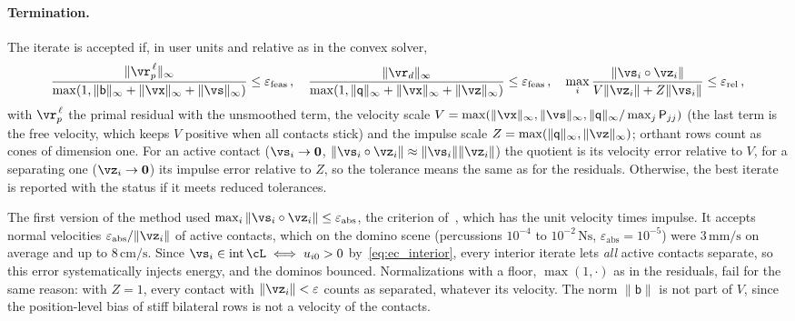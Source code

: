 \paragraph{Termination.} The iterate is accepted if, in user units and relative as in the convex solver,
%
\begin{equation}\label{eq:ec_termination}
	\frac{\|\vr_p^{\,\ell}\|_\infty}{\max(1, \|\mathsf{b}\|_\infty + \|\vx\|_\infty + \|\vs\|_\infty)} \leq \varepsilon_{\mathrm{feas}} \, , \quad
	\frac{\|\vr_d\|_\infty}{\max(1, \|\mathsf{q}\|_\infty + \|\vx\|_\infty + \|\vz\|_\infty)} \leq \varepsilon_{\mathrm{feas}} \, , \quad
	\max_i \frac{\|\vs_i\circ\vz_i\|}{V\|\vz_i\| + Z\|\vs_i\|} \leq \varepsilon_{\mathrm{rel}} \, ,
\end{equation}
%
with $\vr_p^{\,\ell}$ the primal residual with the unsmoothed term, the velocity scale $V = \max(\|\vx\|_\infty, \|\vs\|_\infty, \|\mathsf{q}\|_\infty/\max_j \mathsf{P}_{jj})$ (the last term is the free velocity, which keeps $V$ positive when all contacts stick) and the impulse scale $Z = \max(\|\mathsf{q}\|_\infty, \|\vz\|_\infty)$; orthant rows count as cones of dimension one. For an active contact ($\vs_i \to \mathbf{0}$, $\|\vs_i\circ\vz_i\| \approx \|\vs_i\|\|\vz_i\|$) the quotient is its velocity error relative to $V$, for a separating one ($\vz_i \to \mathbf{0}$) its impulse error relative to $Z$, so the tolerance means the same as for the residuals. Otherwise, the best iterate is reported with the status  if it meets reduced tolerances.

The first version of the method used $\max_i\|\vs_i\circ\vz_i\| \leq \varepsilon_\mathrm{abs}$, the criterion of~\cite{Acary2026}, which has the unit velocity times impulse. It accepts normal velocities $\varepsilon_\mathrm{abs}/\|\vz_i\|$ of active contacts, which on the domino scene (percussions $10^{-4}$ to $10^{-2}\,\mathrm{Ns}$, $\varepsilon_\mathrm{abs} = 10^{-5}$) were $3\,\mathrm{mm/s}$ on average and up to $8\,\mathrm{cm/s}$. Since $\vs_i \in \operatorname{int}\cL \iff u_{i0} > 0$ by~\eqref{eq:ec_interior}, every interior iterate lets \emph{all} active contacts separate, so this error systematically injects energy, and the dominos bounced. Normalizations with a floor, $\max(1, \cdot)$ as in the residuals, fail for the same reason: with $Z = 1$, every contact with $\|\vz_i\| < \varepsilon$ counts as separated, whatever its velocity. The norm $\|\mathsf{b}\|$ is not part of $V$, since the position-level bias of stiff bilateral rows is not a velocity of the contacts.
%
